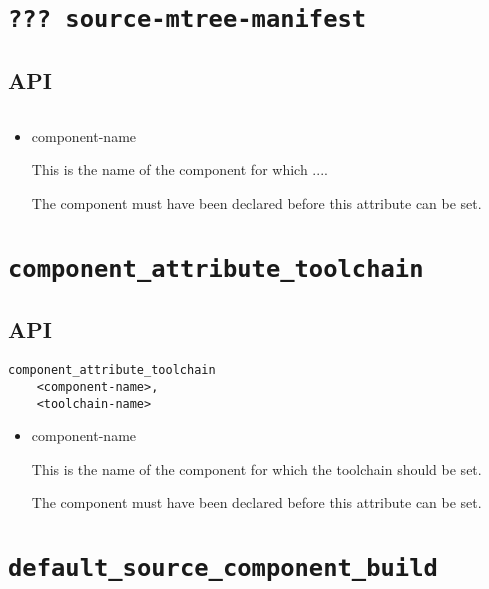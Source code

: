 \section{\texttt{??? source-mtree-manifest}}\label{api:source-mtree-manifest}

\subsection{API}

\begin{verbatim}

\end{verbatim}

\begin{itemize}
\item component-name

  This is the name of the component for which ....

  The component must have been declared before this attribute can be
  set.

\end{itemize}

\section{\texttt{component\_attribute\_toolchain}}\label{api:toolchain}

\subsection{API}

\begin{verbatim}
component_attribute_toolchain
    <component-name>,
    <toolchain-name>
\end{verbatim}

\begin{itemize}
\item component-name

  This is the name of the component for which the toolchain should be
  set.

  The component must have been declared before this attribute can be
  set.
\end{itemize}

\section{\texttt{default\_source\_component\_build}}\label{api:default-source-component-build}

